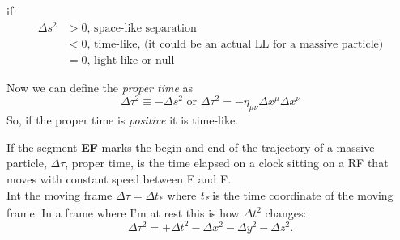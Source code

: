 if 
\begin{align*}
	\Delta s^{2} & > 0 \text{, space-like separation} \\
		     &< 0 \text{, time-like, (it could be an actual LL for a massive particle)} \\
		     &= 0  \text{, light-like or null}
\end{align*}

Now we can define the \emph{proper time} as
\begin{equation}
	\Delta \tau^{2} \equiv - \Delta s^{2} \text{ or } \Delta \tau^{2} = - \eta_{\mu  \nu }\Delta x^{\mu } \Delta x^{\nu }
\end{equation}
So, if the proper time is \emph{positive} it is time-like.

If the segment \textbf{EF} marks the begin and end of the trajectory of a massive particle, $\Delta  \tau $, proper time, is the time elapsed on a clock sitting on a RF that moves with constant speed between E and F.
\\
Int the moving frame $\Delta \tau = \Delta t_{*}$ where \emph{t\textsubscript{*}} is the time coordinate of the moving frame. 
In a frame where I'm at rest this is how $\Delta t^{2}$ changes:
\begin{equation}
\Delta  \tau^{2} = + \Delta t^{2} - \Delta x^{2} - \Delta y^{2}- \Delta z^{2}.
\end{equation}
